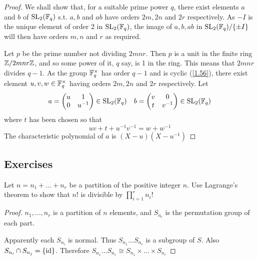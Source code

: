 \documentclass[11pt]{article}
\begin{document}
\begin{proof}
We shall show that, for a suitable prime power \(q\), there exist elements \(a\) and \(b\)
of \(\operatorname{SL}_2(\mathbb{F}_q)\) s.t. \(a,b\) and \(ab\) have orders \(2m,2n\) and \(2r\) respectively.
As \(-I\) is the unique element of order 2 in \(\operatorname{SL}_2(\mathbb{F}_q)\), the image of \(a,b,ab\)
in \(\operatorname{SL}_2(\mathbb{F}_q)/\{\pm I\}\) will then have orders \(m,n\) and \(r\) as required.

Let \(p\) be the prime number not dividing \(2mnr\). Then \(p\) is a unit in the finite
ring \(\mathbb{Z}/2mnr\mathbb{Z}\), and so some power of it, \(q\) say, is 1 in the ring. This means that \(2mnr\)
divides \(q-1\). As the group \(\mathbb{F}_q^\times\) has order \(q-1\) and is cyclic (\ref{1.56}), there exist
element \(u,v,w\in\mathbb{F}_q^{\times}\) having orders \(2m,2n\) and \(2r\) respectively. Let
\begin{equation*}
a=
\begin{pmatrix}
u&1\\0&u^{-1}
\end{pmatrix}\in\operatorname{SL}_2(\mathbb{F}_q)\quad b=
\begin{pmatrix}
v&0\\t&v^{-1}
\end{pmatrix}\in\operatorname{SL}_2(\mathbb{F}_q)
\end{equation*}
where \(t\) has been chosen so that
\begin{equation*}
uv+t+u^{-1}v^{-1}=w+w^{-1}
\end{equation*}
The characteristic polynomial of \(a\) is \((X-u)(X-u^{-1})\)
\end{proof}

\label{SKIP}
\subsection{Exercises}
\label{sec:org52aeba2}
\begin{exercise}
\label{ex1.4}
Let \(n=n_1+\dots+n_r\) be a partition of the positive integer \(n\). Use Lagrange's theorem to show
that \(n!\) is divisible by \(\prod_{i=1}^rn_i!\)
\end{exercise}

\begin{proof}
\(n_1,\dots,n_r\) is a partition of \(n\) elements, and \(S_{n_i}\) is the permutation group of each
part.

Apparently each \(S_{n_i}\) is normal. Thus \(S_{n_1}\dots S_{n_r}\) is a subgroup of \(S\).
Also \(S_{n_i}\cap S_{n_j}=\{\operatorname{id}\}\). Therefore \(S_{n_1}\dots S_{n_r}\cong S_{n_1}\times\dots\times S_{n_r}\)
\end{proof}
\end{document}
